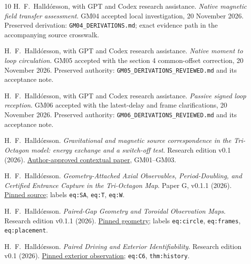 \begin{thebibliography}{10}
H.~F.~Halldórsson, with GPT and Codex research assistance.
\emph{Native magnetic field transfer assessment}.
GM04 accepted local investigation, 20 November 2026.
Preserved derivation: \texttt{GM04\_DERIVATIONS.md}; exact evidence path in the accompanying source crosswalk.

H.~F.~Halldórsson, with GPT and Codex research assistance.
\emph{Native moment to loop circulation}.
GM05 accepted with the section 4 common-offset correction, 20 November 2026.
Preserved authority: \texttt{GM05\_DERIVATIONS\_REVIEWED.md} and its acceptance note.

H.~F.~Halldórsson, with GPT and Codex research assistance.
\emph{Passive signed loop reception}.
GM06 accepted with the latest-delay and frame clarifications, 20 November 2026.
Preserved authority: \texttt{GM06\_DERIVATIONS\_REVIEWED.md} and its acceptance note.

H.~F.~Halldórsson.
\emph{Gravitational and magnetic source correspondence in the Tri-Octagon model: energy exchange and a switch-off test}.
Research edition v0.1 (2026).
\href{https://github.com/pzychozen/trioctagon-physics/blob/01841cac667cc0967de932aaeec0e74632f80e40/papers/GRAVITY_MAGNETISM_SOURCE_CORRESPONDENCE/publication/v0.1/output/GM01_GM03_COMBINED_PAPER_v0.1.pdf}{Author-approved contextual paper}, GM01--GM03.

H.~F.~Halldórsson.
\emph{Geometry-Attached Axial Observables, Period-Doubling, and Certified Entrance Capture in the Tri-Octagon Map}.
Paper G, v0.1.1 (2026).
\href{https://github.com/pzychozen/trioctagon-physics/blob/ca22652dc000ca2b16419c1af4167918eab1ae94/papers/PAPER_G/v0.1.1/source/paper_g.tex}{Pinned source}; labels \texttt{eq:SA}, \texttt{eq:T}, \texttt{eq:W}.

H.~F.~Halldórsson.
\emph{Paired-Gap Geometry and Toroidal Observation Maps}.
Research edition v0.1.1 (2026).
\href{https://github.com/pzychozen/trioctagon-physics/blob/ca22652dc000ca2b16419c1af4167918eab1ae94/SRG_REDISCOVERY/PAPERS/PAIRED_GAP_GEOMETRY_OBSERVATION/publication/v0.1.1/geometry.tex}{Pinned geometry}; labels \texttt{eq:circle}, \texttt{eq:frames}, \texttt{eq:placement}.

H.~F.~Halldórsson.
\emph{Paired Driving and Exterior Identifiability}.
Research edition v0.1 (2026).
\href{https://github.com/pzychozen/trioctagon-physics/blob/ca22652dc000ca2b16419c1af4167918eab1ae94/SRG_REDISCOVERY/PAPERS/PAIRED_DRIVING_EXTERIOR_IDENTIFIABILITY/publication/v0.1/exterior.tex}{Pinned exterior observation}; \texttt{eq:C6}, \texttt{thm:history}.


\end{thebibliography}
